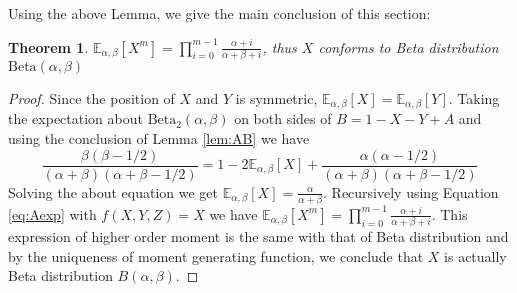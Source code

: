 \documentclass[review,authoryear]{elsarticle}
\def\E{\mathbb{E}}
\def\Beta{\textrm{Beta}}
\newtheorem{theorem}{Theorem}
\begin{document}
Using the above Lemma, we give the main conclusion of this section:
\begin{theorem}\label{thm:Xm}
$\E_{\alpha, \beta}[X^m] =
\prod_{i=0}^{m-1}\frac{\alpha+i}{\alpha+\beta+i}$, thus $X$
conforms to Beta distribution $\Beta(\alpha, \beta)$
\end{theorem}
\begin{proof}
Since the position of $X$ and $Y$ is symmetric,
$\E_{\alpha, \beta}[X]=\E_{\alpha, \beta}[Y]$.
Taking the expectation about $\Beta_2(\alpha, \beta)$
on both sides of $B=1-X-Y+A$ and using the
conclusion of Lemma \ref{lem:AB} we have
\begin{equation*}
\frac{\beta(\beta-1/2)}{(\alpha+\beta)(\alpha+\beta-1/2)}
= 1 - 2\E_{\alpha, \beta}[X] +
\frac{\alpha(\alpha-1/2)}{(\alpha+\beta)(\alpha+\beta-1/2)}
\end{equation*}
Solving the about equation we get
$\E_{\alpha, \beta}[X]=\frac{\alpha}{\alpha + \beta}$.
Recursively using Equation \eqref{eq:Aexp} with $f(X,Y,Z)=X$
we have $\E_{\alpha, \beta}[X^m] =
\prod_{i=0}^{m-1}\frac{\alpha+i}{\alpha+\beta+i}$.
This expression of higher order moment
is the same with that of Beta distribution and by
the uniqueness of moment generating function, we
conclude that $X$ is actually Beta distribution $B(\alpha,
\beta)$.
\end{proof}
\end{document}

